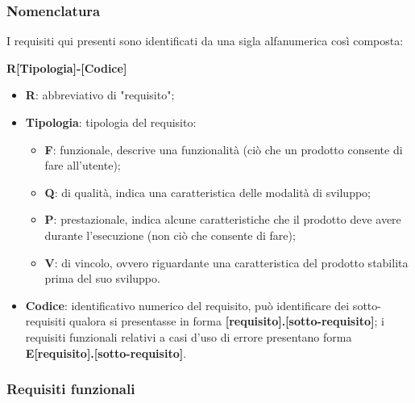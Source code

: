 \subsubsection*{Nomenclatura}

I requisiti qui presenti sono identificati da una sigla alfanumerica così composta:
\begin{center}
    \textbf{R[Tipologia]-[Codice]}
\end{center}

\begin{itemize}
    \item \textbf{R}: abbreviativo di "requisito";
    \item \textbf{Tipologia}: tipologia del requisito:
        \begin{itemize}
            \item \textbf{F}: funzionale, descrive una funzionalità (ciò che un prodotto consente di fare all'utente);
            \item \textbf{Q}: di qualità, indica una caratteristica delle modalità di sviluppo;
            \item \textbf{P}: prestazionale, indica alcune caratteristiche che il prodotto deve avere durante l'esecuzione (non ciò che consente di fare);
            \item \textbf{V}: di vincolo, ovvero riguardante una caratteristica del prodotto stabilita prima del suo sviluppo.
        \end{itemize}
    \item \textbf{Codice}: identificativo numerico del requisito, può identificare dei sotto-requisiti qualora si presentasse in forma \textbf{[requisito].[sotto-requisito]}; i requisiti funzionali relativi a casi d’uso di errore presentano forma \textbf{E[requisito].[sotto-requisito]}.
\end{itemize}

\subsubsection*{Requisiti funzionali}

